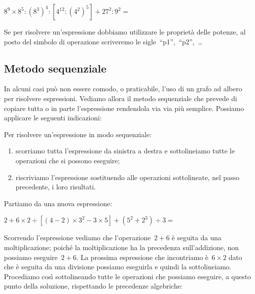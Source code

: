 \begin{esempio}{}{}
  \(8^9 \times 8^5 : (8^3)^4 : [4^{12} : (4^2)^5] + 27^2 : 9^2 =\)

Se per risolvere un'espressione dobbiamo utilizzare le proprietà delle 
potenze, al posto del simbolo di operazione scriveremo le 
sigle~``p1'',~``p2'',~\dots 

\begin{inaccessibleblock}[]
 \begin{center} \espalberob \end{center}
\end{inaccessibleblock}
 \end{esempio}

\subsection{Metodo sequenziale}

In alcuni casi può non essere comodo, o praticabile, l'uso di un grafo ad 
albero per risolvere espressioni. 
Vediamo allora il metodo sequenziale che prevede di copiare tutta o in 
parte l'espressione rendendola via via più semplice. 
Possiamo applicare le seguenti indicazioni:

\begin{procedura}{}{}
 Per risolvere un'espressione in modo sequenziale:
\begin{enumerate} [noitemsep] 
 \item scorriamo tutta l'espressione da sinistra a destra 
 e sottolineiamo tutte le operazioni che si possono eseguire;
 \item riscriviamo l'espressione sostituendo alle operazioni sottolineate,
 nel passo precedente, i loro risultati.
\end{enumerate}
\end{procedura}

Partiamo da una nuova espressione:

\(2 + 6 \times 2 \div 
 \left[ \left(4 -2 \right) \times 3^{2} - 3 \times 5 \right] +
 \left( 5^{2} + 2^{3} \right) \div 3 =\)
 
Scorrendo l'espressione vediamo che l'operazione~\(2 + 6\) è seguita da una 
moltiplicazione; poiché la moltiplicazione ha la precedenza sull'addizione,
non possiamo eseguire~\(2 + 6\). La prossima espressione che incontriamo 
è~\(6 \times 2\) dato che è seguita da una divisione possiamo eseguirla e 
quindi la sottolineiamo. Procediamo così sottolineando tutte le operazioni
che possiamo eseguire, a questo punto della soluzione, rispettando le
precedenze algebriche:

